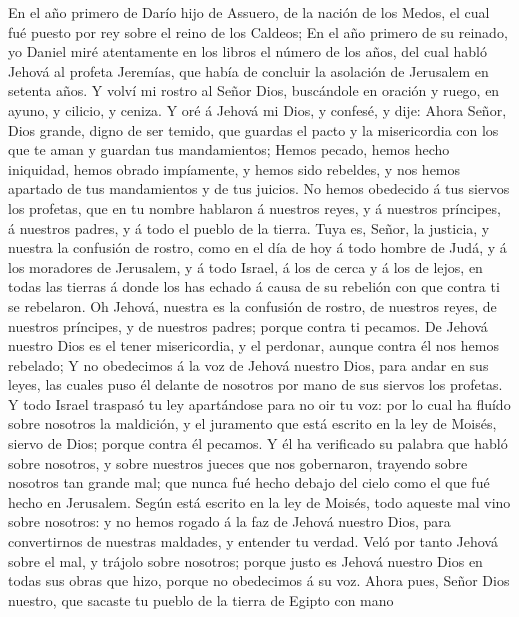  En el año primero de Darío hijo de Assuero, de la nación de
los Medos, el cual fué puesto por rey sobre el reino de los Caldeos;
 En el año primero de su reinado, yo Daniel miré atentamente
en los libros el número de los años, del cual habló Jehová al profeta
Jeremías, que había de concluir la asolación de Jerusalem en setenta
años.  Y volví mi rostro al Señor Dios, buscándole en
oración y ruego, en ayuno, y cilicio, y ceniza.  Y oré á
Jehová mi Dios, y confesé, y dije: Ahora Señor, Dios grande, digno de
ser temido, que guardas el pacto y la misericordia con los que te aman y
guardan tus mandamientos;  Hemos pecado, hemos hecho
iniquidad, hemos obrado impíamente, y hemos sido rebeldes, y nos hemos
apartado de tus mandamientos y de tus juicios.  No hemos
obedecido á tus siervos los profetas, que en tu nombre hablaron á
nuestros reyes, y á nuestros príncipes, á nuestros padres, y á todo el
pueblo de la tierra.  Tuya es, Señor, la justicia, y nuestra
la confusión de rostro, como en el día de hoy á todo hombre de Judá, y á
los moradores de Jerusalem, y á todo Israel, á los de cerca y á los de
lejos, en todas las tierras á donde los has echado á causa de su
rebelión con que contra ti se rebelaron.  Oh Jehová, nuestra
es la confusión de rostro, de nuestros reyes, de nuestros príncipes, y
de nuestros padres; porque contra ti pecamos.  De Jehová
nuestro Dios es el tener misericordia, y el perdonar, aunque contra él
nos hemos rebelado;  Y no obedecimos á la voz de Jehová
nuestro Dios, para andar en sus leyes, las cuales puso él delante de
nosotros por mano de sus siervos los profetas.  Y todo
Israel traspasó tu ley apartándose para no oir tu voz: por lo cual ha
fluído sobre nosotros la maldición, y el juramento que está escrito en
la ley de Moisés, siervo de Dios; porque contra él pecamos.
 Y él ha verificado su palabra que habló sobre nosotros, y
sobre nuestros jueces que nos gobernaron, trayendo sobre nosotros tan
grande mal; que nunca fué hecho debajo del cielo como el que fué hecho
en Jerusalem.  Según está escrito en la ley de Moisés, todo
aqueste mal vino sobre nosotros: y no hemos rogado á la faz de Jehová
nuestro Dios, para convertirnos de nuestras maldades, y entender tu
verdad.  Veló por tanto Jehová sobre el mal, y trájolo
sobre nosotros; porque justo es Jehová nuestro Dios en todas sus obras
que hizo, porque no obedecimos á su voz.  Ahora pues, Señor
Dios nuestro, que sacaste tu pueblo de la tierra de Egipto con mano
